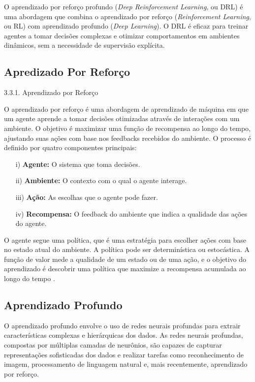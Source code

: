 O aprendizado por reforço profundo (\textit{Deep Reinforcement Learning}, ou DRL) é uma abordagem que combina o aprendizado por reforço (\textit{Reinforcement Learning}, ou RL) com aprendizado profundo (\textit{Deep Learning}). O DRL é eficaz para treinar agentes a tomar decisões complexas e otimizar comportamentos em ambientes dinâmicos, sem a necessidade de supervisão explícita.

\subsection{Apredizado Por Reforço}

3.3.1. Aprendizado por Reforço

O aprendizado por reforço é uma abordagem de aprendizado de máquina em que um agente aprende a tomar decisões otimizadas através de interações com um ambiente. O objetivo é maximizar uma função de recompensa ao longo do tempo, ajustando suas ações com base nos feedbacks  recebidos do ambiente. O processo é definido por quatro componentes principais:

\begin{itemize}
    \item[i)] \textbf{Agente:} O sistema que toma decisões.
    \item[ii)] \textbf{Ambiente:} O contexto com o qual o agente interage.
    \item[iii)] \textbf{Ação:} As escolhas que o agente pode fazer.
    \item[iv)] \textbf{Recompensa:} O feedback do ambiente que indica a qualidade das ações do agente.
\end{itemize}

O agente segue uma política, que é uma estratégia para escolher ações com base no estado atual do ambiente. A política pode ser determinística ou estocástica. A função de valor mede a qualidade de um estado ou de uma ação, e o objetivo do aprendizado é descobrir uma política que maximize a recompensa acumulada ao longo do tempo \cite{sutton2018reinforcement}.

\subsection{Aprendizado Profundo}

O aprendizado profundo envolve o uso de redes neurais profundas para extrair características complexas e hierárquicas dos dados. As redes neurais profundas, compostas por múltiplas camadas de neurônios, são capazes de capturar representações sofisticadas dos dados e realizar tarefas como reconhecimento de imagem, processamento de linguagem natural e, mais recentemente, aprendizado por reforço.

